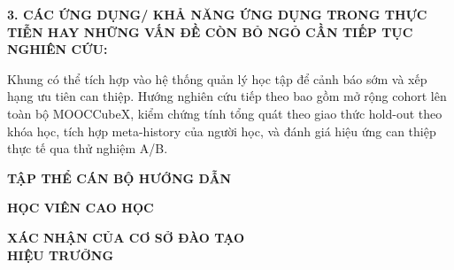 \vspace{0.2cm}
\noindent\textbf{3. CÁC ỨNG DỤNG/ KHẢ NĂNG ỨNG DỤNG TRONG THỰC TIỄN HAY NHỮNG VẤN ĐỀ CÒN BỎ NGỎ CẦN TIẾP TỤC NGHIÊN CỨU:}

\noindent Khung có thể tích hợp vào hệ thống quản lý học tập để cảnh báo sớm và xếp hạng ưu tiên can thiệp. Hướng nghiên cứu tiếp theo bao gồm mở rộng cohort lên toàn bộ MOOCCubeX, kiểm chứng tính tổng quát theo giao thức hold-out theo khóa học, tích hợp meta-history của người học, và đánh giá hiệu ứng can thiệp thực tế qua thử nghiệm A/B.

\vspace{0.5cm}
\noindent
\begin{minipage}[t]{0.48\textwidth}
\centering
\textbf{TẬP THỂ CÁN BỘ HƯỚNG DẪN}\\[1.3cm]
\cbhd
\end{minipage}\hfill
\begin{minipage}[t]{0.48\textwidth}
\centering
\textbf{HỌC VIÊN CAO HỌC}\\[1.3cm]
\hvchname
\end{minipage}

\vspace{0.8cm}
\begin{center}
\textbf{XÁC NHẬN CỦA CƠ SỞ ĐÀO TẠO}\\[1.1cm]
\textbf{HIỆU TRƯỞNG}
\end{center}

\clearpage

